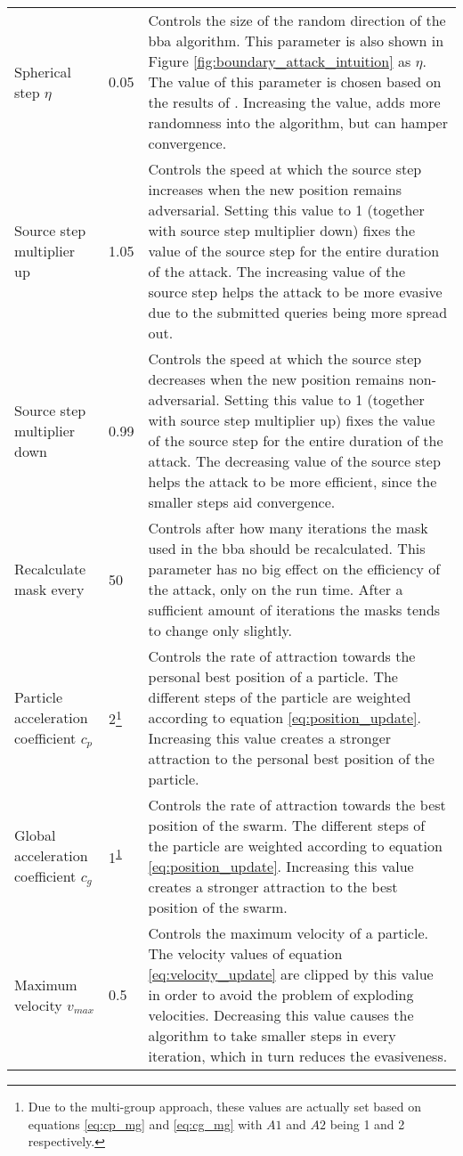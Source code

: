 \begin{longtable}{p{3cm}p{2.5cm}p{7cm}}
Spherical step $\eta$	&0.05 & Controls the size of the random direction of the \gls{bba} algorithm. This parameter is also shown in Figure \ref{fig:boundary_attack_intuition} as $\eta$. The value of this parameter is chosen based on the results of \cite{brunner_guessing_2019}. Increasing the value, adds more randomness into the algorithm, but can hamper convergence.\\
Source step multiplier up &1.05	&Controls the speed at which the source step increases when the new position remains adversarial. Setting this value to 1 (together with source step multiplier down) fixes the value of the source step for the entire duration of the attack. The increasing value of the source step helps the attack to be more evasive due to the submitted queries being more spread out.\\
Source step multiplier down &0.99 &Controls the speed at which the source step decreases when the new position remains non-adversarial. Setting this value to 1 (together with source step multiplier up) fixes the value of the source step for the entire duration of the attack. The decreasing value of the source step helps the attack to be more efficient, since the smaller steps aid convergence.\\
Recalculate mask every &50	&Controls after how many iterations the mask used in the \gls{bba} should be recalculated. This parameter has no big effect on the efficiency of the attack, only on the run time. After a sufficient amount of iterations the masks tends to change only slightly.\\
Particle acceleration coefficient $c_p$ &2\footnote{\label{ftn:cp} Due to the multi-group approach, these values are actually set based on equations \ref{eq:cp_mg} and \ref{eq:cg_mg} with $A1$ and $A2$ being 1 and 2 respectively.} &Controls the rate of attraction towards the personal best position of a particle. The different steps of the particle are weighted according to equation \ref{eq:position_update}. Increasing this value creates a stronger attraction to the personal best position of the particle.\\
Global acceleration coefficient $c_g$ &1\textsuperscript{\ref{ftn:cp}} &Controls the rate of attraction towards the best position of the swarm. The different steps of the particle are weighted according to equation \ref{eq:position_update}. Increasing this value creates a stronger attraction to the best position of the swarm.\\
Maximum velocity $v_{max}$ &0.5 &Controls the maximum velocity of a particle. The velocity values of equation \ref{eq:velocity_update} are clipped by this value in order to avoid the problem of exploding velocities. Decreasing this value causes the algorithm to take smaller steps in every iteration, which in turn reduces the evasiveness.\\

\end{longtable}
